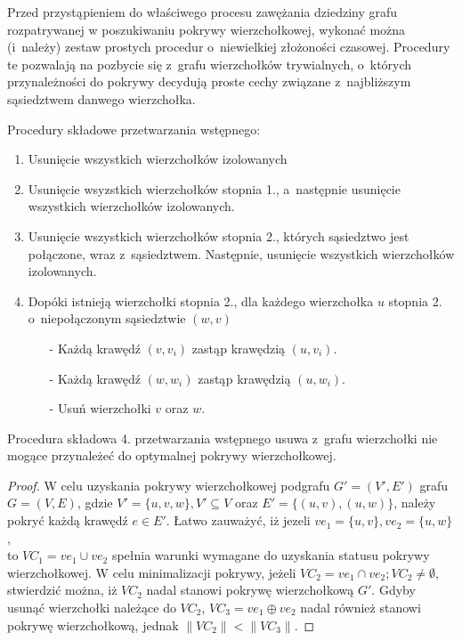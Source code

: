 Przed przystąpieniem do właściwego procesu zawężania dziedziny grafu
rozpatrywanej w poszukiwaniu pokrywy wierzchołkowej, wykonać można (i~należy)
zestaw prostych procedur o~niewielkiej złożoności czasowej.
Procedury te pozwalają na pozbycie się z~grafu wierzchołków trywialnych,
o~których przynależności do pokrywy decydują proste cechy związane
z~najbliższym sąsiedztwem danwego wierzchołka.


Procedury składowe przetwarzania wstępnego:
\begin{enumerate}
  \item Usunięcie wszystkich wierzchołków izolowanych
  \item Usunięcie wsyzstkich wierzchołków stopnia 1., a~następnie usunięcie
    wszystkich wierzchołków izolowanych.
  \item Usunięcie wszystkich wierzchołków stopnia 2., których sąsiedztwo jest
    połączone, wraz z~sąsiedztwem. Następnie, usunięcie wszystkich
    wierzchołków izolowanych.
  \item Dopóki istnieją wierzchołki stopnia 2., dla każdego wierzchołka $u$ 
    stopnia 2. o~niepołączonym sąsiedztwie $(w,v)$
    \begin{itemize}
      \item[-] Każdą krawędź $(v,v_i)$ zastąp krawędzią $(u, v_i)$.
      \item[-] Każdą krawędź $(w,w_i)$ zastąp krawędzią $(u, w_i)$.
      \item[-] Usuń wierzchołki $v$ oraz $w$.
    \end{itemize}
\end{enumerate}

\begin{theorem}
  Procedura składowa 4. przetwarzania wstępnego usuwa z~grafu wierzchołki nie 
  mogące przynależeć do optymalnej pokrywy wierzchołkowej.
\end{theorem}
\begin{proof}
  W celu uzyskania pokrywy wierzchołkowej podgrafu $G\prime=(V\prime,E\prime)$
  grafu $G=(V,E)$, gdzie $V\prime=\{u, v, w\}, V\prime \subseteq V$ oraz 
  $E\prime=\{(u,v), (u,w)\}$, należy pokryć każdą krawędź $e \in E\prime$. 
  Łatwo zauważyć, iż jezeli $ve_1=\{u,v\}, ve_2=\{u,w\}$, \\
  to $VC_1=ve_1 \cup ve_2$ spełnia warunki wymagane do uzyskania statusu
  pokrywy wierzchołkowej.
  W celu minimalizacji pokrywy, jeżeli $VC_2=ve_1 \cap ve_2; VC_2 \neq \emptyset$,
  stwierdzić można, iż $VC_2$ nadal stanowi pokrywę wierzchołkową $G\prime$.
  Gdyby usunąć wierzchołki należące do $VC_2$, $VC_3=ve_1 \oplus ve_2$ nadal
  również stanowi pokrywę wierzchołkową, jednak $\|VC_2\| < \|VC_3\|$.
\end{proof}

